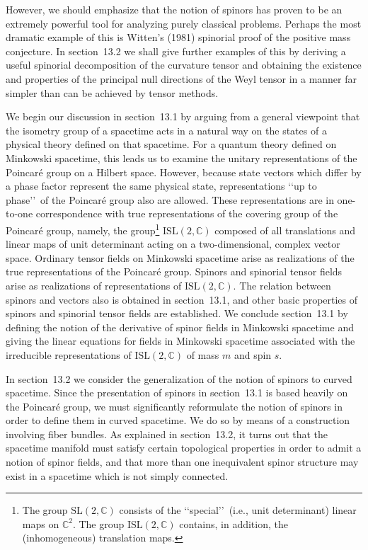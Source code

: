 However, we should emphasize that the notion of spinors has proven to be an
extremely powerful tool for analyzing purely classical problems. Perhaps the most
dramatic example of this is Witten's (1981) spinorial proof of the positive mass
conjecture. In section~13.2 we shall give further examples of this by deriving a
useful spinorial decomposition of the curvature tensor and obtaining the existence
and properties of the principal null directions of the Weyl tensor in a manner far
simpler than can be achieved by tensor methods.

We begin our discussion in section~13.1 by arguing from a general viewpoint that
the isometry group of a spacetime acts in a natural way on the states of a physical
theory defined on that spacetime. For a quantum theory defined on Minkowski
spacetime, this leads us to examine the unitary representations of the Poincar\'e
group on a Hilbert space. However, because state vectors which differ by a phase
factor represent the same physical state, representations \lq\lq up to phase\rq\rq\
of the Poincar\'e group also are allowed. These representations are in one-to-one
correspondence with true representations of the covering group of the Poincar\'e
group, namely, the group\footnote{The group \(\mathrm{SL}(2,\mathbb C)\) consists
of the \lq\lq special\rq\rq\ (i.e., unit determinant) linear maps on
\(\mathbb C^2\). The group \(\mathrm{ISL}(2,\mathbb C)\) contains, in addition, the
(inhomogeneous) translation maps.} \(\mathrm{ISL}(2,\mathbb C)\) composed of all
translations and linear maps of unit determinant acting on a two-dimensional,
complex vector space. Ordinary tensor fields on Minkowski spacetime arise as
realizations of the true representations of the Poincar\'e group. Spinors and
spinorial tensor fields arise as realizations of representations of
\(\mathrm{ISL}(2,\mathbb C)\). The relation between spinors and vectors also is
obtained in section~13.1, and other basic properties of spinors and spinorial tensor
fields are established. We conclude section~13.1 by defining the notion of the
derivative of spinor fields in Minkowski spacetime and giving the linear equations
for fields in Minkowski spacetime associated with the irreducible representations of
\(\mathrm{ISL}(2,\mathbb C)\) of mass \(m\) and spin \(s\).

In section~13.2 we consider the generalization of the notion of spinors to curved
spacetime. Since the presentation of spinors in section~13.1 is based heavily on the
Poincar\'e group, we must significantly reformulate the notion of spinors in order to
define them in curved spacetime. We do so by means of a construction involving fiber
bundles. As explained in section~13.2, it turns out that the spacetime manifold must
satisfy certain topological properties in order to admit a notion of spinor fields,
and that more than one inequivalent spinor structure may exist in a spacetime which
is not simply connected.

